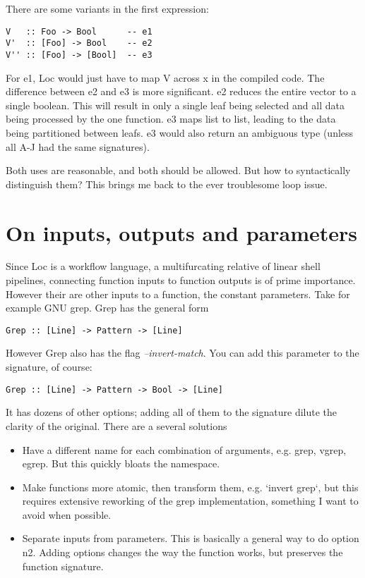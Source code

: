\documentclass[12pt]{article}
\begin{document}
There are some variants in the first expression:

\begin{verbatim}
V   :: Foo -> Bool      -- e1
V'  :: [Foo] -> Bool    -- e2
V'' :: [Foo] -> [Bool]  -- e3
\end{verbatim}

For e1, Loc would just have to map V across x in the compiled code. The
difference between e2 and e3 is more significant. e2 reduces the entire vector
to a single boolean. This will result in only a single leaf being selected and
all data being processed by the one function. e3 maps list to list, leading to
the data being partitioned between leafs. e3 would also return an ambiguous
type (unless all A-J had the same signatures).

Both uses are reasonable, and both should be allowed. But how to syntactically
distinguish them? This brings me back to the ever troublesome loop issue.

\section{On inputs, outputs and parameters}

Since Loc is a workflow language, a multifurcating relative of linear shell
pipelines, connecting function inputs to function outputs is of prime
importance. However their are other inputs to a function, the constant
parameters. Take for example GNU grep. Grep has the general form

\begin{verbatim}
Grep :: [Line] -> Pattern -> [Line]
\end{verbatim}

However Grep also has the flag {\it --invert-match}. You can add this parameter to the signature, of course:

\begin{verbatim}
Grep :: [Line] -> Pattern -> Bool -> [Line]
\end{verbatim}

It has dozens of other options; adding all of them to the signature dilute the
clarity of the original. There are a several solutions

\begin{itemize}
 \item Have a different name for each combination of arguments, e.g. grep, vgrep,
    egrep. But this quickly bloats the namespace.
 \item Make functions more atomic, then transform them, e.g. `invert grep`, but
    this requires extensive reworking of the grep implementation, something
    I want to avoid when possible. 
 \item Separate inputs from parameters. This is basically a general way to do
    option n2. Adding options changes the way the function works, but preserves
    the function signature.
\end{itemize}
\end{document}
